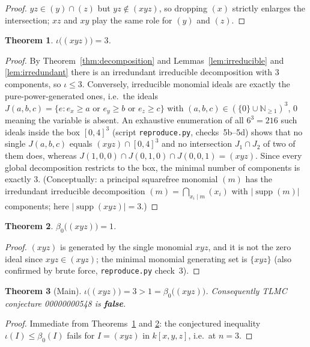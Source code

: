 \documentclass[11pt]{article}
\newtheorem{theorem}{Theorem}
\theoremstyle{definition}
\theoremstyle{remark}
\begin{document}
\begin{proof}
$yz\in(y)\cap(z)$ but $yz\notin(xyz)$, so dropping $(x)$ strictly enlarges the
intersection; $xz$ and $xy$ play the same role for $(y)$ and $(z)$.
\end{proof}

\begin{theorem}\label{thm:iota}
$\iota\big((xyz)\big)=3$.
\end{theorem}

\begin{proof}
By Theorem~\ref{thm:decomposition} and Lemmas~\ref{lem:irreducible} and
\ref{lem:irredundant} there is an irredundant irreducible decomposition with
$3$ components, so $\iota\le3$. Conversely, irreducible monomial ideals are
exactly the pure-power-generated ones, i.e.\ the ideals
$J(a,b,c)=\{e: e_x\ge a \text{ or } e_y\ge b \text{ or } e_z\ge c\}$ with
$(a,b,c)\in(\{0\}\cup\mathbb{N}_{\ge1})^3$, $0$ meaning the variable is
absent. An exhaustive enumeration of all $6^3=216$ such ideals inside the box
$[0,4]^3$ (script \texttt{reproduce.py}, checks~5b--5d) shows that no single
$J(a,b,c)$ equals $(xyz)\cap[0,4]^3$ and no intersection $J_1\cap J_2$ of two
of them does, whereas $J(1,0,0)\cap J(0,1,0)\cap J(0,0,1)=(xyz)$. Since every
global decomposition restricts to the box, the minimal number of components is
exactly $3$. (Conceptually: a principal squarefree monomial $(m)$ has the
irredundant irreducible decomposition $(m)=\bigcap_{x_i\mid m}(x_i)$ with
$|\operatorname{supp}(m)|$ components; here $|\operatorname{supp}(xyz)|=3$.)
\end{proof}

\begin{theorem}\label{thm:beta0}
$\beta_0\big((xyz)\big)=1$.
\end{theorem}

\begin{proof}
$(xyz)$ is generated by the single monomial $xyz$, and it is not the zero
ideal since $xyz\in(xyz)$; the minimal monomial generating set is
$\{xyz\}$ (also confirmed by brute force, \texttt{reproduce.py} check~3).
\end{proof}

\begin{theorem}[Main]\label{thm:main}
$\iota\big((xyz)\big)=3>1=\beta_0\big((xyz)\big)$. Consequently TLMC
conjecture 00000000548 is \textbf{false}.
\end{theorem}

\begin{proof}
Immediate from Theorems~\ref{thm:iota} and \ref{thm:beta0}: the conjectured
inequality $\iota(I)\le\beta_0(I)$ fails for $I=(xyz)$ in $k[x,y,z]$, i.e.\ at
$n=3$.
\end{proof}
\end{document}

